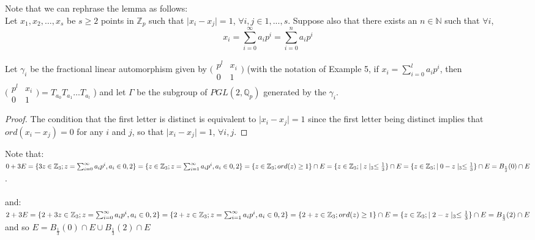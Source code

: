 \begin{framed}
Note that we can rephrase the lemma as follows:\\ Let $x_1,x_2,\ldots,x_s$ be $s \geq 2$ points in $\mathbb{Z}_p$ such that $\mid x_i - x_j \mid = 1$, $\forall i,j \in 1,...,s$. Suppose also that there exists an $n \in \mathbb{N}$ such that  $\forall i$, $$x_i = \sum_{i=0}^{\infty} a_ip^i = \sum_{i=0}^{n} a_ip^i $$

Let $\gamma_i$ be the fractional linear automorphism given by $\bigl( \begin{smallmatrix}p^l & x_i\\ 0 & 1 \end{smallmatrix}\bigr)$ (with the notation of Example 5, if $x_i=\sum_{i=0}^{l}a_ip^i$, then $\bigl( \begin{smallmatrix}p^l & x_i\\ 0 & 1 \end{smallmatrix}\bigr) = T_{a_0}T_{a_1}\ldots T_{a_l}$ ) and let $\Gamma$ be the subgroup of $PGL(2, \mathbb{Q}_p)$ generated by the $\gamma_i$. 


\end{framed}	

\begin{proof}
	 The condition that the first letter is distinct is equivalent to $\mid x_i - x_j \mid =1$ since the first letter  being distinct implies that $ord(x_i - x_j) = 0$ for any $i$ and $j$, so that $\mid x_i - x_j\mid =1$, $\forall i,j$.
	 
\end{proof}

Note that:\newline $0 + 3E = \{3z \in \mathbb{Z}_3; z = \sum_{i=0}^\infty a_ip^i, a_i \in {0,2}\} =\\
\{z \in \mathbb{Z}_3; z = \sum_{i=1}^\infty a_ip^i, a_i \in {0,2}\} =\\
\{z \in \mathbb{Z}_3; ord(z) \geq 1 \} \cap E=\\
\{z \in \mathbb{Z}_3; \mid z \mid_3 \leq \frac{1}{3}\} \cap E = \\
\{z \in \mathbb{Z}_3; \mid 0- z \mid_3 \leq \frac{1}{3}\} \cap E = B_{\frac{1}{3}}(0) \cap E$.
\\\\and:\\ 
$2 + 3E = \{2 + 3z \in \mathbb{Z}_3; z = \sum_{i=0}^\infty a_ip^i, a_i \in {0,2}\} =\\
\{2 + z \in \mathbb{Z}_3; z = \sum_{i=1}^\infty a_ip^i, a_i \in {0,2}\} =\\
\{2 + z \in \mathbb{Z}_3; ord(z) \geq 1 \} \cap E=\\
\{z \in \mathbb{Z}_3; \mid 2 - z \mid_3 \leq \frac{1}{3}\} \cap E = \\
B_{\frac{1}{3}}(2) \cap E$
\\ and so $E = B_{\frac{1}{3}}(0)\cap E \cup B_{\frac{1}{3}}(2) \cap E$


